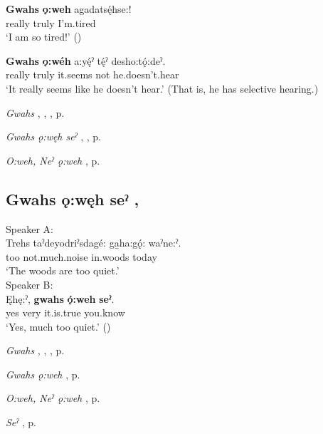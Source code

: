 \ea
\label{ex:gpar105}
\gll \textbf{Gwahs} \textbf{ǫ:weh} agadatsę́hse:!\\
really truly I’m.tired\\
\glt ‘I am so tired!’ (\cite{carrier_legends_2013})
\z

\ea
\label{ex:gpar106}
\gll \textbf{Gwahs} \textbf{ǫ:wéh} a:yę́ˀ tę́ˀ desho:tǫ́:deˀ.\\
really truly it.seems not he.doesn’t.hear\\
\glt ‘It really seems like he doesn’t hear.’ (That is, he has selective hearing.)
\z

\begin{CayugaRelated}
\item \textit{Gwahs} , , , p. \pageref{p:[gwahs] ‘really’}\\
\item \textit{Gwahs ǫ:węh seˀ} , , p. \pageref{p:[gwahs ǫ:węh seˀ]}\\
\item \textit{O:weh, Neˀ ǫ:weh} , p. \pageref{p:[ǫ:weh, neˀ ǫ:weh]}
\end{CayugaRelated}


\subsection*{\textbf{Gwahs ǫ:węh seˀ} , } \label{p:[gwahs ǫ:węh seˀ]}

\ea
\label{ex:gpar107} Speaker A: \\
\gll Trehs taˀdeyodriˀsdagé: ga̱ha:gǫ́: waˀne:ˀ. \\
too not.much.noise in.woods today\\
\glt `The woods are too quiet.’\\
Speaker B: \\
\gll Ęhę:ˀ, \textbf{gwahs} \textbf{ǫ́:weh} \textbf{seˀ}.\\
yes very it.is.true you.know \\
\glt `Yes, much too quiet.’ (\cite{carrier_legends_2013})
\z


\begin{CayugaRelated}
\item \textit{Gwahs} , , , p. \pageref{p:[gwahs] ‘really’}\\
\item \textit{Gwahs ǫ:weh} , p. \pageref{p:[gwahs ǫ:weh]}\\
\item \textit{O:weh, Neˀ ǫ:weh} , p. \pageref{p:[ǫ:weh, neˀ ǫ:weh]}\\
\item \textit{Seˀ} , p. \pageref{p:[seˀ]}
\end{CayugaRelated}



